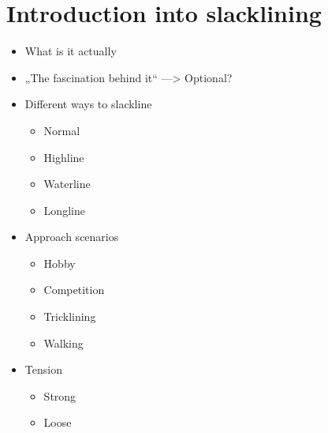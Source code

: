 \section{Introduction into slacklining}\label{3_1_introductionSlacklining}
\begin{itemize}
\item What is it actually
\item „The fascination behind it“ —> Optional?
\item Different ways to slackline

\begin{itemize}
\item Normal
\item Highline
\item Waterline
\item Longline
\end{itemize}

\item Approach scenarios
\begin{itemize}
\item Hobby
\item Competition
\item Tricklining
\item Walking
\end{itemize}

\item Tension
\begin{itemize}
\item Strong
\item Loose
\end{itemize}

\end{itemize}